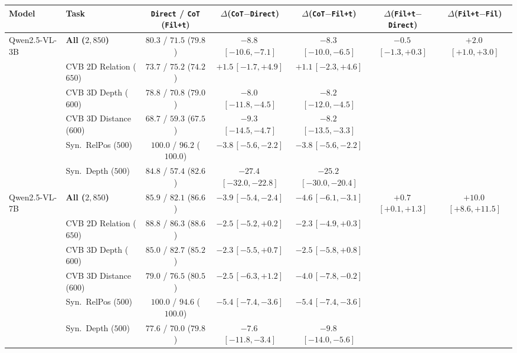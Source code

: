 \begin{tabular}{@{}llccccc@{}}
\toprule
Model & Task & \texttt{Direct} / \texttt{CoT} (\texttt{Fil+t}) & $\Delta$(\texttt{CoT}$-$\texttt{Direct}) & $\Delta$(\texttt{CoT}$-$\texttt{Fil+t}) & $\Delta$(\texttt{Fil+t}$-$\texttt{Direct}) & $\Delta$(\texttt{Fil+t}$-$\texttt{Fil}) \\
\midrule
Qwen2.5-VL-3B & \textbf{All ($2{,}850$)} & $80.3$ / $71.5$ ($79.8$) & $-8.8$\,{\scriptsize$[-10.6, -7.1]$} & $-8.3$\,{\scriptsize$[-10.0, -6.5]$} & $-0.5$\,{\scriptsize$[-1.3, +0.3]$} & $+2.0$\,{\scriptsize$[+1.0, +3.0]$} \\
 & CVB 2D Relation ($650$) & $73.7$ / $75.2$ ($74.2$) & $+1.5$\,{\scriptsize$[-1.7, +4.9]$} & $+1.1$\,{\scriptsize$[-2.3, +4.6]$} & & \\
 & CVB 3D Depth ($600$) & $78.8$ / $70.8$ ($79.0$) & $-8.0$\,{\scriptsize$[-11.8, -4.5]$} & $-8.2$\,{\scriptsize$[-12.0, -4.5]$} & & \\
 & CVB 3D Distance ($600$) & $68.7$ / $59.3$ ($67.5$) & $-9.3$\,{\scriptsize$[-14.5, -4.7]$} & $-8.2$\,{\scriptsize$[-13.5, -3.3]$} & & \\
 & Syn.\ RelPos ($500$) & $100.0$ / $96.2$ ($100.0$) & $-3.8$\,{\scriptsize$[-5.6, -2.2]$} & $-3.8$\,{\scriptsize$[-5.6, -2.2]$} & & \\
 & Syn.\ Depth ($500$) & $84.8$ / $57.4$ ($82.6$) & $-27.4$\,{\scriptsize$[-32.0, -22.8]$} & $-25.2$\,{\scriptsize$[-30.0, -20.4]$} & & \\
\midrule
Qwen2.5-VL-7B & \textbf{All ($2{,}850$)} & $85.9$ / $82.1$ ($86.6$) & $-3.9$\,{\scriptsize$[-5.4, -2.4]$} & $-4.6$\,{\scriptsize$[-6.1, -3.1]$} & $+0.7$\,{\scriptsize$[+0.1, +1.3]$} & $+10.0$\,{\scriptsize$[+8.6, +11.5]$} \\
 & CVB 2D Relation ($650$) & $88.8$ / $86.3$ ($88.6$) & $-2.5$\,{\scriptsize$[-5.2, +0.2]$} & $-2.3$\,{\scriptsize$[-4.9, +0.3]$} & & \\
 & CVB 3D Depth ($600$) & $85.0$ / $82.7$ ($85.2$) & $-2.3$\,{\scriptsize$[-5.5, +0.7]$} & $-2.5$\,{\scriptsize$[-5.8, +0.8]$} & & \\
 & CVB 3D Distance ($600$) & $79.0$ / $76.5$ ($80.5$) & $-2.5$\,{\scriptsize$[-6.3, +1.2]$} & $-4.0$\,{\scriptsize$[-7.8, -0.2]$} & & \\
 & Syn.\ RelPos ($500$) & $100.0$ / $94.6$ ($100.0$) & $-5.4$\,{\scriptsize$[-7.4, -3.6]$} & $-5.4$\,{\scriptsize$[-7.4, -3.6]$} & & \\
 & Syn.\ Depth ($500$) & $77.6$ / $70.0$ ($79.8$) & $-7.6$\,{\scriptsize$[-11.8, -3.4]$} & $-9.8$\,{\scriptsize$[-14.0, -5.6]$} & & \\

\end{tabular}
